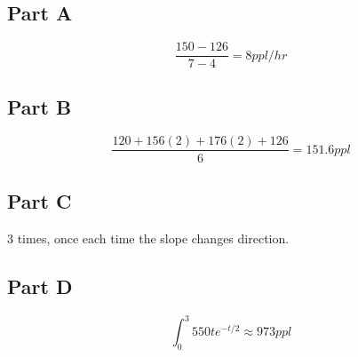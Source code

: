 \subsection{Part A}
\[ \frac{150 - 126}{7-4} = 8 ppl/hr \]

\subsection{Part B}
\[ \frac{120 + 156(2) + 176(2) + 126}{6} = 151.6 ppl \]

\subsection{Part C}
3 times, once each time the slope changes direction.

\subsection{Part D}
\[ \int_{0}^{3} 550te^{-t/2} \approx 973 ppl \]

